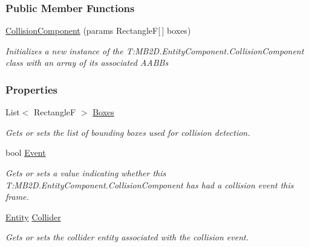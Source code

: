 \subsubsection*{Public Member Functions}
\begin{DoxyCompactItemize}
\item 
\hyperlink{class_m_b2_d_1_1_entity_component_1_1_collision_component_a6367fc81a9baf226bdd98cdc5814f5ac}{Collision\+Component} (params RectangleF\mbox{[}$\,$\mbox{]} boxes)
\begin{DoxyCompactList}\small\item\em Initializes a new instance of the T\+:\+M\+B2\+D.\+Entity\+Component.\+Collision\+Component class with an array of its associated A\+A\+BB\textquotesingle{}s \end{DoxyCompactList}\end{DoxyCompactItemize}
\subsubsection*{Properties}
\begin{DoxyCompactItemize}
\item 
List$<$ RectangleF $>$ \hyperlink{class_m_b2_d_1_1_entity_component_1_1_collision_component_a1cc63c601df7e30ce5b63e50b487dc9e}{Boxes}
\begin{DoxyCompactList}\small\item\em Gets or sets the list of bounding boxes used for collision detection. \end{DoxyCompactList}\item 
bool \hyperlink{class_m_b2_d_1_1_entity_component_1_1_collision_component_ad393ea9f0115ee346e469e5c335da26d}{Event}
\begin{DoxyCompactList}\small\item\em Gets or sets a value indicating whether this T\+:\+M\+B2\+D.\+Entity\+Component.\+Collision\+Component has had a collision event this frame. \end{DoxyCompactList}\item 
\hyperlink{class_m_b2_d_1_1_entity_component_1_1_entity}{Entity} \hyperlink{class_m_b2_d_1_1_entity_component_1_1_collision_component_aac8e61b6e669a4451fb2e8859827b47a}{Collider}
\begin{DoxyCompactList}\small\item\em Gets or sets the collider entity associated with the collision event. \end{DoxyCompactList}\end{DoxyCompactItemize}


